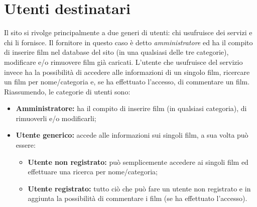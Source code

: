 \documentclass[../Relazione.tex]{subfiles}
\begin{document}
\section{Utenti destinatari}

Il sito si rivolge principalmente a due generi di utenti: chi usufruisce dei servizi e chi li fornisce. Il fornitore in questo caso è detto \textit{amministratore} ed ha il compito di inserire film nel database del sito (in una qualsiasi delle tre categorie), modificare e/o rimuovere film già caricati. L'utente che usufruisce del servizio invece ha la possibilità di accedere alle informazioni di un singolo film, ricercare un film per nome/categoria e, se ha effettuato l'accesso, di commentare un film. Riassumendo, le categorie di utenti sono:

\begin{itemize}
\item \textbf{Amministratore:} ha il compito di inserire film (in qualsiasi categoria), di rimuoverli e/o modificarli;
\item \textbf{Utente generico:} accede alle informazioni sui singoli film, a sua volta può essere:
\begin{itemize}
\item \textbf{Utente non registrato:} può semplicemente accedere ai singoli film ed effettuare una ricerca per nome/categoria;
\item \textbf{Utente registrato: } tutto ciò che può fare un utente non registrato e in aggiunta la possibilità di commentare i film (se ha effettuato l'accesso).
\end{itemize}
\end{itemize}
			
\end{document}
